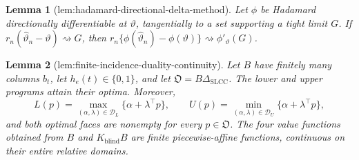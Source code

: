 \documentclass{article}
\newtheorem{lemma}{Lemma}
\begin{document}
\begin{lemma}[lem:hadamard-directional-delta-method]\label{lem:hadamard-directional-delta-method}
Let \(\phi\) be Hadamard directionally differentiable at \(\vartheta\), tangentially to a set supporting a tight limit \(G\). If \(r_n(\widehat\vartheta_n-\vartheta)\rightsquigarrow G\), then \(r_n\{\phi(\widehat\vartheta_n)-\phi(\vartheta)\}\rightsquigarrow\phi'_{\vartheta}(G)\).
\end{lemma}

\begin{lemma}[lem:finite-incidence-duality-continuity]\label{lem:finite-incidence-duality-continuity}
Let \(B\) have finitely many columns \(b_t\), let \(h_e(t)\in\{0,1\}\), and let \(\mathfrak O=B\Delta_{\mathrm{SLCC}}\).  The lower and upper programs attain their optima.  Moreover,
\[
L(p)=\max_{(\alpha,\lambda)\in\mathcal D_L}\{\alpha+\lambda^{\top}p\},
\qquad
U(p)=\min_{(\alpha,\lambda)\in\mathcal D_U}\{\alpha+\lambda^{\top}p\},
\]
and both optimal faces are nonempty for every \(p\in\mathfrak O\).  The four value functions obtained from \(B\) and \(K_{\mathrm{blind}}B\) are finite piecewise-affine functions, continuous on their entire relative domains.
\end{lemma}
\end{document}

